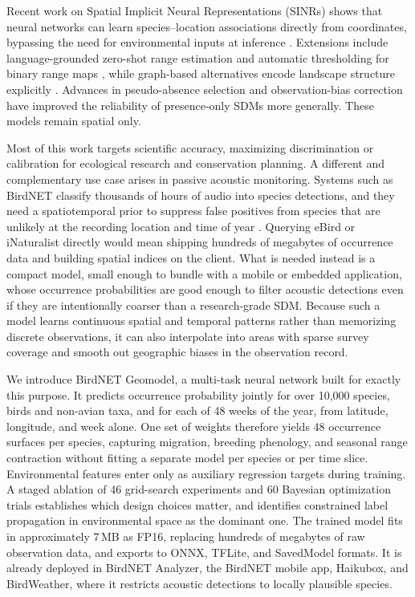 Recent work on Spatial Implicit Neural Representations (SINRs) shows that neural networks can learn species--location associations directly from coordinates, bypassing the need for environmental inputs at inference \citep{cole2023spatial}. Extensions include language-grounded zero-shot range estimation \citep{hamilton2024combining} and automatic thresholding for binary range maps \citep{dorm2024generating}, while graph-based alternatives encode landscape structure explicitly \citep{harrell2025heterogeneous,wu2025gnn}. Advances in pseudo-absence selection \citep{zbinden2024selection} and observation-bias correction \citep{botella2020bias,johnston2021analytical} have improved the reliability of presence-only SDMs more generally. These models remain spatial only.

Most of this work targets scientific accuracy, maximizing discrimination or calibration for ecological research and conservation planning. A different and complementary use case arises in passive acoustic monitoring. Systems such as BirdNET \citep{kahl2021birdnet} classify thousands of hours of audio into species detections, and they need a spatiotemporal prior to suppress false positives from species that are unlikely at the recording location and time of year \citep{thompson2025post}. Querying eBird or iNaturalist directly would mean shipping hundreds of megabytes of occurrence data and building spatial indices on the client. What is needed instead is a compact model, small enough to bundle with a mobile or embedded application, whose occurrence probabilities are good enough to filter acoustic detections even if they are intentionally coarser than a research-grade SDM. Because such a model learns continuous spatial and temporal patterns rather than memorizing discrete observations, it can also interpolate into areas with sparse survey coverage and smooth out geographic biases in the observation record.

We introduce BirdNET Geomodel, a multi-task neural network built for exactly this purpose. It predicts occurrence probability jointly for over 10,000 species, birds and non-avian taxa, and for each of 48 weeks of the year, from latitude, longitude, and week alone. One set of weights therefore yields 48 occurrence surfaces per species, capturing migration, breeding phenology, and seasonal range contraction without fitting a separate model per species or per time slice. Environmental features enter only as auxiliary regression targets during training. A staged ablation of 46 grid-search experiments and 60 Bayesian optimization trials establishes which design choices matter, and identifies constrained label propagation in environmental space as the dominant one. The trained model fits in approximately 7\,MB as FP16, replacing hundreds of megabytes of raw observation data, and exports to ONNX, TFLite, and SavedModel formats. It is already deployed in BirdNET Analyzer, the BirdNET mobile app, Haikubox, and BirdWeather, where it restricts acoustic detections to locally plausible species.


